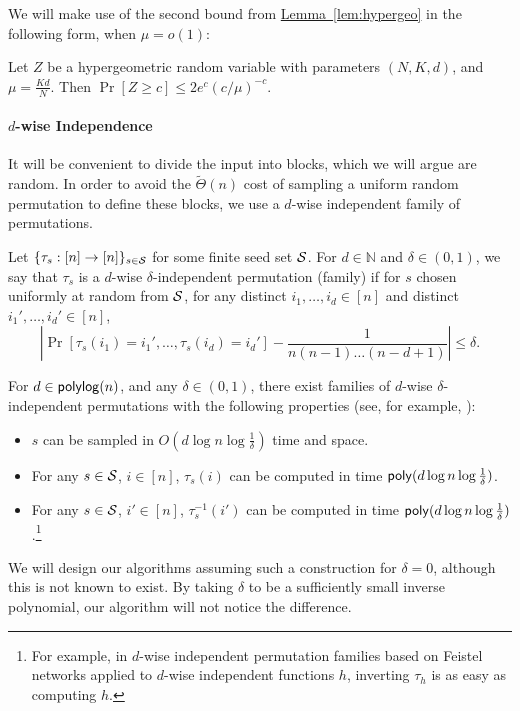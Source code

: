 \documentclass{article}
\newcommand{\lem}[1]{\hyperref[lem:#1]{Lemma~\ref*{lem:#1}}}
\renewcommand{\>}{\rangle}
\newcommand{\<}{\langle}
\renewcommand{\(}{\left(}
\renewcommand{\)}{\right)}
\def\abs#1{\left| #1 \right|}
\begin{document}
\noindent We will make use of the second bound from \lem{hypergeo} in the following form, when $\mu=o(1)$:
\begin{corollary}\label{cor:hypergeo}
Let $Z$ be a hypergeometric random variable with parameters $(N,K,d)$, and $\mu=\frac{Kd}{N}$. Then $\Pr[Z\geq c]\leq 2e^c(c/\mu)^{-c}$. 
\end{corollary}


\paragraph{$d$-wise Independence} It will be convenient to divide the input into blocks, which we will argue are random. In order to avoid the $\widetilde{\Theta}(n)$ cost of sampling a uniform random permutation to define these blocks, we use a $d$-wise independent family of permutations.
\begin{definition}\label{def:d-wise}
Let $\{\tau_s:[n]\rightarrow[n]\}_{s\in {\cal S}}$ for some finite seed set ${\cal S}$. For $d\in \mathbb{N}$ and $\delta\in (0,1)$, we say that $\tau_s$ is a $d$-wise $\delta$-independent permutation (family) if for $s$ chosen uniformly at random from ${\cal S}$, for any distinct $i_1,\dots,i_d\in [n]$ and distinct $i_1',\dots,i_d'\in [n]$,
$$\abs{\Pr[\tau_s(i_1)=i_1',\dots,\tau_s(i_d)=i_d'] - \frac{1}{n(n-1)\dots (n-d+1)}}\leq \delta.$$
\end{definition}

For $d\in {\sf polylog}(n)$, and any $\delta \in (0,1)$, there exist families of $d$-wise $\delta$-independent permutations with the following properties (see, for example, \cite{kaplan2009derandomized}):
\begin{itemize}
\item $s$ can be sampled in $O(d\log n \log\frac{1}{\delta})$ time and space.
\item For any $s\in {\cal S}$, $i\in [n]$, $\tau_s(i)$ can be computed in time ${\sf poly}(d\log n\log\frac{1}{\delta})$.
\item For any $s\in {\cal S}$, $i'\in [n]$, $\tau_s^{-1}(i')$ can be computed in time ${\sf poly}(d\log n\log\frac{1}{\delta})$.\footnote{For example, in $d$-wise independent permutation families based on Feistel networks applied to $d$-wise independent functions $h$, inverting $\tau_h$ is as easy as computing $h$.}
\end{itemize}
We will design our algorithms assuming such a construction for $\delta=0$, although this is not known to exist. By taking $\delta$ to be a sufficiently small inverse polynomial, our algorithm will not notice the difference. 
\end{document}
